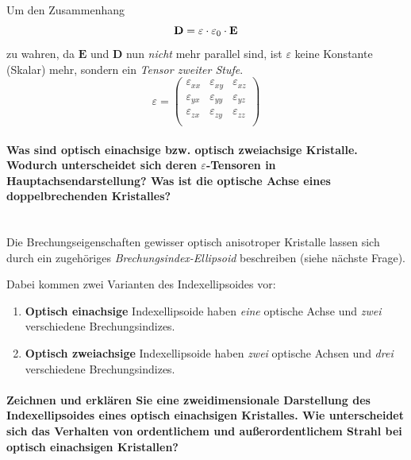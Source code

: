 \documentclass[a4paper, 11pt, ngerman, parskip=half-]{scrartcl}
\begin{document}
Um den Zusammenhang
\[\vb{D} = \varepsilon \cdot \varepsilon_0 \cdot \vb{E}\]
zu wahren, da $\textbf{E}$ und  $\textbf{D}$ nun \textit{nicht} mehr parallel sind, ist $\varepsilon$ keine Konstante (Skalar) mehr, sondern ein \textit{Tensor zweiter Stufe}.
\[\varepsilon = \begin{pmatrix}
        \varepsilon_{xx} & \varepsilon_{xy} & \varepsilon_{xz} \\
        \varepsilon_{yx} & \varepsilon_{yy} & \varepsilon_{yz} \\
        \varepsilon_{zx} & \varepsilon_{zy} & \varepsilon_{zz} \\
    \end{pmatrix}\]
%
\paragraph{Was sind optisch einachsige bzw. optisch zweiachsige Kristalle. Wodurch unterscheidet sich deren $\varepsilon$-Tensoren in Hauptachsendarstellung? Was ist die optische Achse eines doppelbrechenden Kristalles?}~\\

Die Brechungseigenschaften gewisser optisch anisotroper Kristalle lassen sich durch ein zugehöriges \textit{Brechungsindex-Ellipsoid} beschreiben (siehe nächste Frage).

Dabei kommen zwei Varianten des Indexellipsoides vor:
%
\begin{enumerate}
    \item \textbf{Optisch einachsige} Indexellipsoide haben \textit{eine} optische Achse und \textit{zwei} verschiedene Brechungsindizes.
    \item \textbf{Optisch zweiachsige} Indexellipsoide haben \textit{zwei} optische Achsen und \textit{drei} verschiedene Brechungsindizes.
\end{enumerate}
%
\paragraph{Zeichnen und erklären Sie eine zweidimensionale Darstellung des Indexellipsoides eines optisch einachsigen Kristalles.
    Wie unterscheidet sich das Verhalten von ordentlichem und außerordentlichem Strahl bei optisch einachsigen Kristallen?}
%
\end{document}
